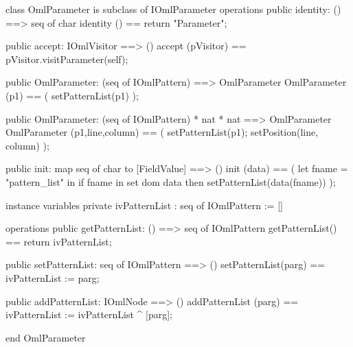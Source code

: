 \begin{vdm_al}
class OmlParameter is subclass of IOmlParameter
operations
  public identity: () ==> seq of char
  identity () == return "Parameter";

  public accept: IOmlVisitor ==> ()
  accept (pVisitor) == pVisitor.visitParameter(self);

  public OmlParameter:
    (seq of IOmlPattern) ==> OmlParameter
  OmlParameter (p1) == 
    ( setPatternList(p1) );

  public OmlParameter:
    (seq of IOmlPattern) *
    nat *
    nat ==> OmlParameter
  OmlParameter (p1,line,column) == 
    ( setPatternList(p1);
      setPosition(line, column) );

  public init: map seq of char to [FieldValue] ==> ()
  init (data) ==
    ( let fname = "pattern_list" in
        if fname in set dom data
        then setPatternList(data(fname)) );

instance variables
  private ivPatternList : seq of IOmlPattern := []

operations
  public getPatternList: () ==> seq of IOmlPattern
  getPatternList() == return ivPatternList;

  public setPatternList: seq of IOmlPattern ==> ()
  setPatternList(parg) == ivPatternList := parg;

  public addPatternList: IOmlNode ==> ()
  addPatternList (parg) == ivPatternList := ivPatternList ^ [parg];

end OmlParameter
\end{vdm_al}

